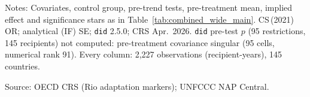 \begin{table}[H]
\centering
\caption{Effect of NAP adoption on climate finance: simple ATT across outcomes (all cohorts retained, asymptotic SE)}
\label{tab:combined_wide_robust}
\begingroup\small
{}
\endgroup
\par\vspace{4pt}
\begin{minipage}{\linewidth}\footnotesize
Notes: Covariates, control group, pre-trend tests, pre-treatment mean, implied effect and significance stars as in Table~\ref{tab:combined_wide_main}. CS\,(2021) OR; analytical (IF) SE; \texttt{did} 2.5.0; CRS Apr.\ 2026. \texttt{did} pre-test $p$ (95 restrictions, 145 recipients) not computed: pre-treatment covariance singular (95 cells, numerical rank 91). Every column: 2,227 observations (recipient-years), 145 countries.\par
Source: OECD CRS (Rio adaptation markers); UNFCCC NAP Central.
\end{minipage}
\end{table}
